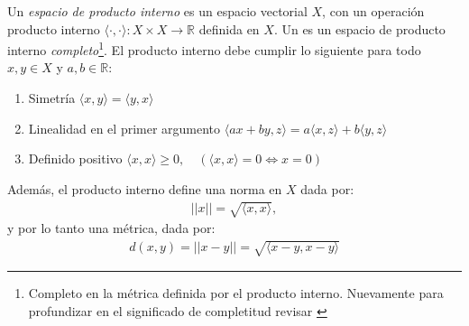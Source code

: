 \documentclass[12pt]{book}
\begin{document}
\begin{definitionenv}
    Un \textit{espacio de producto interno} es un espacio vectorial $X$, con un operación producto interno $\langle\cdot,\cdot\rangle:X\times X\to\mathbb{R}$ definida en $X$. Un  es un espacio de producto interno \textit{completo}\footnote{Completo en la métrica definida por el producto interno. Nuevamente para profundizar en el significado de completitud revisar \cite[Chapter 1, Section 1.4]{kreyszig1991introductory}}. El producto interno debe cumplir lo siguiente para todo $x,y\in X$ y $a,b\in\mathbb{R}$:
    \begin{enumerate}
        \item Simetría $\langle x,y\rangle=\langle y,x\rangle$
        \item Linealidad en el primer argumento $\langle ax+by,z\rangle= a\langle x,z\rangle + b\langle y,z\rangle$
        \item Definido positivo $\langle x,x\rangle \ge 0,\quad (\langle x,x\rangle =0\iff x=0)$
    \end{enumerate}
    Además, el producto interno define una norma en $X$ dada por:
    \begin{align*}
        ||x||=\sqrt{\langle x,x\rangle},
    \end{align*}
    y por lo tanto una métrica, dada por:
    \begin{align*}
        d(x,y)=||x-y||=\sqrt{\langle x-y,x-y\rangle}
    \end{align*}
\end{definitionenv}
\end{document}
